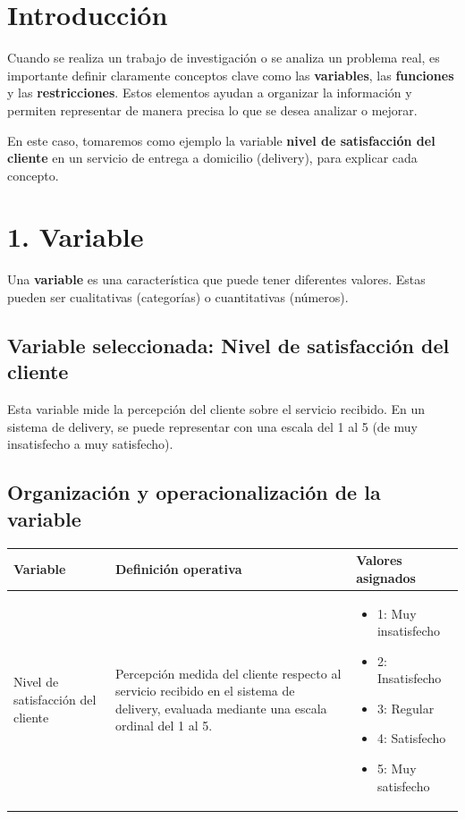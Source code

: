 \documentclass[12pt]{article}
\begin{document}
\section*{Introducción}
Cuando se realiza un trabajo de investigación o se analiza un problema real, es importante definir claramente conceptos clave como las \textbf{variables}, las \textbf{funciones} y las \textbf{restricciones}. Estos elementos ayudan a organizar la información y permiten representar de manera precisa lo que se desea analizar o mejorar.

En este caso, tomaremos como ejemplo la variable \textbf{nivel de satisfacción del cliente} en un servicio de entrega a domicilio (delivery), para explicar cada concepto.

\section*{1. Variable}
Una \textbf{variable} es una característica que puede tener diferentes valores. Estas pueden ser cualitativas (categorías) o cuantitativas (números).

\subsection*{Variable seleccionada: Nivel de satisfacción del cliente}
Esta variable mide la percepción del cliente sobre el servicio recibido. En un sistema de delivery, se puede representar con una escala del 1 al 5 (de muy insatisfecho a muy satisfecho).

\subsection*{Organización y operacionalización de la variable}

\begin{center}
\renewcommand{\arraystretch}{1.5} %
\begin{tabular}{|p{4.5cm}|p{6.5cm}|p{4cm}|}
\hline
\textbf{Variable} & \textbf{Definición operativa} & \textbf{Valores asignados} \\
\hline
Nivel de satisfacción del cliente & 
Percepción medida del cliente respecto al servicio recibido en el sistema de delivery, evaluada mediante una escala ordinal del 1 al 5. & 
\begin{itemize}
    \item 1: Muy insatisfecho
    \item 2: Insatisfecho
    \item 3: Regular
    \item 4: Satisfecho
    \item 5: Muy satisfecho
\end{itemize} \\
\hline
\end{tabular}
\end{center}
\end{document}

